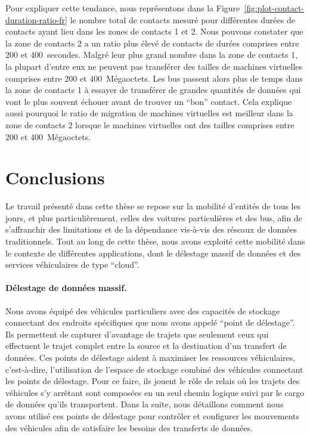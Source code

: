  
Pour expliquer cette tendance, nous représentons dans la Figure~\ref{fig:plot-contact-duration-ratio-fr} le nombre total de contacts mesuré pour différentes durées de contacts ayant lieu dans les zones de contacts 1 et 2. Nous pouvons constater que la zone de contacts 2 a un ratio plus élevé  de contacts de durées comprises entre 200 et 400~secondes. Malgré leur plus grand nombre dans la zone de contacts 1, la plupart d’entre eux ne peuvent pas transférer des tailles de machines virtuelles comprises entre 200 et 400~Mégaoctets. Les bus passent alors plus de temps dans la zone de contacts 1 à essayer de transférer de grandes quantités de données qui vont le plus souvent échouer avant de trouver un ``bon'' contact. Cela explique aussi pourquoi le ratio de migration de machines virtuelles est meilleur dans la zone de contacts 2 lorsque le machines virtuelles ont des tailles comprises entre 200 et 400~Mégaoctets. 

\section{Conclusions} 
 
 
Le travail présenté dans cette thèse se repose sur la mobilité d’entités de tous les jours, et plus particulièrement, celles des voitures particulières et des bus, afin de s’affranchir des limitations et de la dépendance vis-à-vis des réseaux de données traditionnels. Tout au long de cette thèse, nous avons exploité cette mobilité dans le contexte de différentes applications, dont le délestage massif de données et des services véhiculaires de type ``cloud''. 
 
 
\paragraph{Délestage de données massif.} 
Nous avons équipé des véhicules particuliers avec des capacités de stockage connectant des endroits spécifiques que nous avons appelé ``point de délestage''. Ils permettent de capturer d'avantage de trajets que seulement ceux qui effectuent le trajet complet entre la source et la destination d’un transfert de données. Ces points de délestage aident à maximiser les ressources véhiculaires, c’est-à-dire, l’utilisation de l’espace de stockage combiné des véhicules connectant les points de délestage. Pour ce faire, ils jouent le rôle de relais où les trajets des véhicules s’y arrêtant sont composées en un seul chemin logique suivi par le cargo de données qu’ils transportent. Dans la suite, nous détaillons comment nous avons utilisé ces points de délestage pour contrôler et configurer les mouvements des véhicules afin de satisfaire les besoins des transferts de données. 
 
